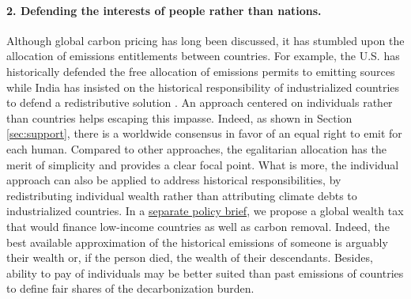 \documentclass[12pt,english]{article}
\begin{document}
\paragraph*{2. Defending the interests of people rather than nations.}
Although global carbon pricing has long been discussed, it has stumbled upon the allocation of emissions entitlements between countries. 
For example, the U.S. has historically defended the free allocation of emissions permits to emitting sources while India has insisted on the historical responsibility of industrialized countries to defend a redistributive solution \citep{bertram_tradeable_1992,michaelowa_report_2012}. 
An approach centered on individuals rather than countries helps escaping this impasse. Indeed, as shown in Section \ref{sec:support}, there is a worldwide consensus in favor of an equal right to emit for each human. 
Compared to other approaches, the egalitarian allocation has the merit of simplicity and provides a clear focal point. 
What is more, the individual approach can also be applied to address historical responsibilities, by redistributing individual wealth rather than attributing climate debts to industrialized countries. In a \href{https://github.com/bixiou/global_tax_attitudes/blob/main/paper/policy_brief_tax.pdf}{separate policy brief}, %
we propose a global wealth tax that would finance low-income countries as well as carbon removal. 
Indeed, the best available approximation of the historical emissions of someone is arguably their wealth or, if the person died, the wealth of their descendants. Besides, ability to pay of individuals may be better suited than past emissions of countries to define fair shares of the decarbonization burden. %
\end{document}
